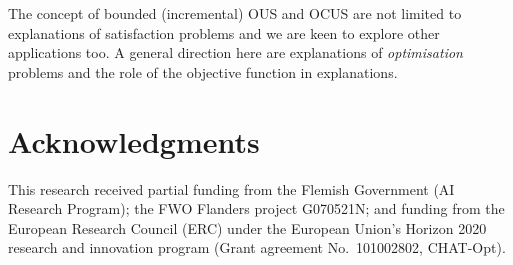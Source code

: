 The concept of bounded (incremental) OUS and OCUS are not limited to explanations of satisfaction problems and we are keen to explore other applications too.
A general direction here are explanations of \textit{optimisation} problems and the role of the objective function in explanations.
%

\section*{Acknowledgments}
This research received partial funding
from the Flemish Government (AI Research Program); the FWO Flanders project G070521N; and funding from the European Research Council (ERC) under the European Union’s Horizon 2020 research and innovation program (Grant agreement No.~101002802, CHAT-Opt).
